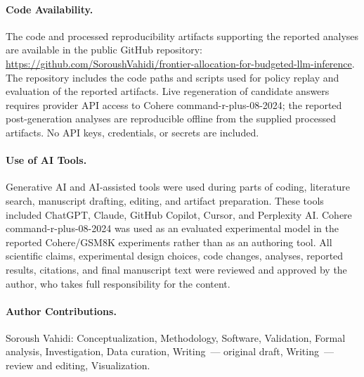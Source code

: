 \paragraph{Code Availability.}
The code and processed reproducibility artifacts supporting the reported analyses
are available in the public GitHub repository:
\url{https://github.com/SoroushVahidi/frontier-allocation-for-budgeted-llm-inference}.
The repository includes the code paths and scripts used for policy replay and
evaluation of the reported artifacts. Live regeneration of candidate answers
requires provider API access to Cohere command-r-plus-08-2024; the reported
post-generation analyses are reproducible offline from the supplied processed
artifacts. No API keys, credentials, or secrets are included.

\paragraph{Use of AI Tools.}
Generative AI and AI-assisted tools were used during parts of coding, literature
search, manuscript drafting, editing, and artifact preparation. These tools
included ChatGPT, Claude, GitHub Copilot, Cursor, and Perplexity AI.
Cohere command-r-plus-08-2024 was used as an evaluated experimental model in the
reported Cohere/GSM8K experiments rather than as an authoring tool. All
scientific claims, experimental design choices, code changes, analyses,
reported results, citations, and final manuscript text were reviewed and
approved by the author, who takes full responsibility for the content.

\paragraph{Author Contributions.}
Soroush Vahidi: Conceptualization, Methodology, Software, Validation, Formal
analysis, Investigation, Data curation, Writing~--- original draft,
Writing~--- review and editing, Visualization.
